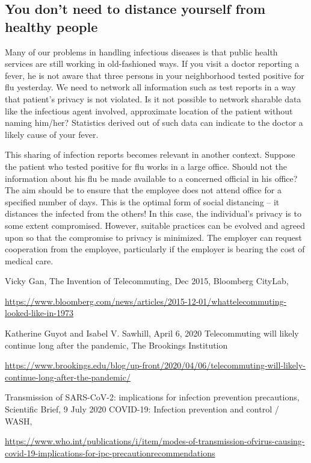 \begin{multicols}{2}
\vspace{-.4cm}

\section{You don’t need to distance yourself from healthy people}\label{section-6}

\vspace{-.2cm}

Many of our problems in handling infectious diseases is that public health services are still working in old-fashioned ways. If you visit a doctor reporting a fever, he is not aware that three persons in your neighborhood tested positive for flu yesterday. We need to network all information such as test reports in a way that patient’s privacy is not violated. Is it not possible to network sharable data like the infectious agent involved, approximate location of the patient without naming him/her? Statistics derived out of such data can indicate to the doctor a likely cause of your fever.

This sharing of infection reports becomes relevant in another context. Suppose the patient who tested positive for flu works in a large office. Should not the information about his flu be made available to a concerned official in his office? The aim should be to ensure that the employee does not attend office for a specified number of days. This is the optimal form of social distancing – it distances the infected from the others! In this case, the individual’s privacy is to some extent compromised. However, suitable practices can be evolved and agreed upon so that the compromise to privacy is minimized. The employer can request cooperation from the employee, particularly if the employer is bearing the cost of medical care.

\begin{thebibliography}{99}

 Vicky Gan, The Invention of Telecommuting, Dec 2015, Bloomberg CityLab,


\url{https://www.bloomberg.com/news/articles/2015-12-01/whattelecommuting-looked-like-in-1973}

 Katherine Guyot and Isabel V. Sawhill, April 6, 2020 Telecommuting will likely continue long after the pandemic, The Brookings Institution

\url{https://www.brookings.edu/blog/up-front/2020/04/06/telecommuting-will-likely-continue-long-after-the-pandemic/}

 Transmission of SARS-CoV-2: implications for infection prevention precautions, Scientific Brief, 9 July 2020 COVID-19: Infection prevention and control / WASH,

\url{https://www.who.int/publications/i/item/modes-of-transmission-ofvirus-causing-covid-19-implications-for-ipc-precautionrecommendations}

\end{thebibliography}

\end{multicols}
